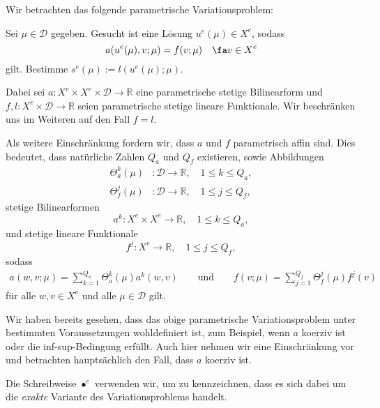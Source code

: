 Wir betrachten das folgende parametrische Variationsproblem:
\begin{addmargin}[2em]{2em}
    Sei $\mu \in \mathcal D$ gegeben. Gesucht ist eine Lösung $u^e(\mu) \in X^e$, sodass
    \begin{equation}
        a(u^e(\mu), v; \mu) = f(v; \mu) \quad \fa v \in X^e
    \end{equation}
    gilt.
    Bestimme $s^e(\mu) := l(u^e(\mu); \mu)$.
\end{addmargin}
Dabei sei $a \colon X^e \times X^e \times \mathcal D \to \mathbb{R}$ eine parametrische stetige Bilinearform und $f, l \colon X^e \times \mathcal D \to \mathbb{R}$ seien parametrische stetige lineare Funktionale.
Wir beschränken uns im Weiteren auf den Fall $f = l$.

Als weitere Einschränkung fordern wir, dass $a$ und $f$ parametrisch affin sind.
Dies bedeutet, dass natürliche Zahlen $Q_a$ und $Q_f$ existieren, sowie Abbildungen
\begin{align}
    \Theta_a^k(\mu) &\colon \mathcal D \to \mathbb{R}, \quad 1 \leq k \leq Q_a, \\
    \Theta_f^j(\mu) &\colon \mathcal D \to \mathbb{R}, \quad 1 \leq j \leq Q_f,
\end{align}
stetige Bilinearformen
\begin{equation}
    a^k \colon X^e \times X^e \to \mathbb{R}, \quad 1 \leq k \leq Q_a,
\end{equation}
und stetige lineare Funktionale
\begin{equation}
    f^j \colon X^e \to \mathbb{R}, \quad 1 \leq j \leq Q_f,
\end{equation}
sodass
\begin{align*}
    a(w, v; \mu) = \sum_{k=1}^{Q_a} \Theta_a^k(\mu) a^k(w, v)
    \qquad \text{und} \qquad
    f(v; \mu)    = \sum_{j=1}^{Q_f} \Theta_f^j(\mu) f^j(v)
\end{align*}
für alle $w, v \in X^e$ und alle $\mu \in \mathcal D$ gilt.

Wir haben bereits gesehen, dass das obige parametrische Variationsproblem unter bestimmten Voraussetzungen wohldefiniert ist, zum Beispiel, wenn $a$ koerziv ist oder die inf-sup-Bedingung erfüllt.
Auch hier nehmen wir eine Einschränkung vor und betrachten hauptsächlich den Fall, dass $a$ koerziv ist.

Die Schreibweise $\bullet^e$ verwenden wir, um zu kennzeichnen, dass es sich dabei um die \emph{exakte} Variante des Variationsproblems handelt.

